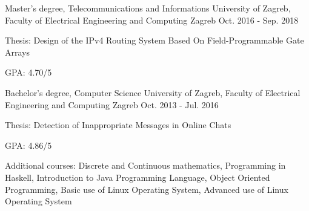 
\begin{cventries}

  \cventry
    {Master's degree, Telecommunications and Informations} %
    {University of Zagreb, Faculty of Electrical Engineering and Computing} %
    {Zagreb} %
    {Oct. 2016 - Sep. 2018} %
    {
      \begin{cvitems} %
        \item {Thesis: Design of the IPv4 Routing System Based On Field-Programmable Gate Arrays}
        \item {GPA: 4.70/5}
      \end{cvitems}
    }

  \cventry
    {Bachelor's degree, Computer Science} %
    {University of Zagreb, Faculty of Electrical Engineering and Computing} %
    {Zagreb} %
    {Oct. 2013 - Jul. 2016} %
    {
      \begin{cvitems} %
        \item {Thesis: Detection of Inappropriate Messages in Online Chats}
        \item {GPA: 4.86/5}
        \item {Additional courses: Discrete and Continuous mathematics, Programming in Haskell, Introduction to Java Programming Language, Object Oriented Programming, Basic use of Linux Operating System, Advanced use of Linux Operating System}
      \end{cvitems}
    }

\end{cventries}
